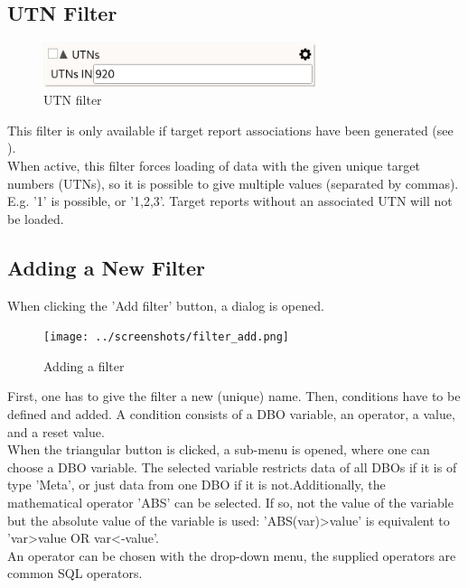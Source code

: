 \subsection{UTN Filter}

\begin{figure}[H]
  \center
    \includegraphics[width=8cm,frame]{../screenshots/filter_utn.png}
  \caption{UTN filter}
\end{figure}

This filter is only available if target report associations have been generated (see ). \\

When active, this filter forces loading of data with the given unique target numbers (UTNs), so it is possible to give multiple values (separated by commas). E.g. '1' is possible, or '1,2,3'. Target reports without an associated UTN will not be loaded. \\

\subsection{Adding a New Filter}
When clicking the 'Add filter' button, a dialog is opened.

\begin{figure}[H]
  \center
    \texttt{[image: ../screenshots/filter\_add.png]}
  \caption{Adding a filter}
  \label{fig:filter_add}
\end{figure}

First, one has to give the filter a new (unique) name. Then, conditions have to be defined and added. A condition consists of a DBO variable, an operator, a value, and a reset value. \\

When the triangular button is clicked, a sub-menu is opened, where one can choose a DBO variable. The selected variable restricts data of all DBOs if it is of type 'Meta', or just data from one DBO if it is not.Additionally, the mathematical operator 'ABS' can be selected. If so, not the value of the variable but the absolute value of the variable is used: 'ABS(var)>value' is equivalent to 'var>value OR var<-value'. \\

An operator can be chosen with the drop-down menu, the supplied operators are common SQL operators.

